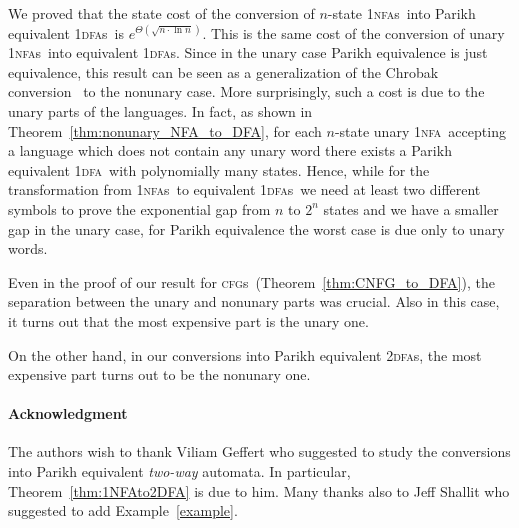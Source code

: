 \documentclass[11pt]{article}
\newcommand*{\tw}{\textsc{2}}
\newcommand*{\twdfas}{\tw\textsc{dfa}s}
\newcommand*{\ow}{\textsc{1}}
\newcommand*{\owdfa}{\ow\textsc{dfa}}
\newcommand*{\owdfas}{\ow\textsc{dfa}s}
\newcommand*{\ownfa}{\ow\textsc{nfa}}
\newcommand*{\ownfas}{\ow\textsc{nfa}s}
\newcommand*{\cfgs}{\textsc{cfg}s}
\begin{document}
We proved that the state cost of the conversion of $n$-state \ownfas\ into Parikh equivalent \owdfas\ is 
$e^{\Theta(\sqrt{n \cdot \ln n})}$. This is the same cost of the conversion of unary \ownfas\
into equivalent \owdfas.
Since in the unary case Parikh equivalence is just equivalence, this result can be seen as
a generalization of the Chrobak conversion~\cite{Chrobak1986} to the nonunary case.
More surprisingly, such a cost is due to the unary parts of the languages. In fact, as shown
in Theorem~\ref{thm:nonunary_NFA_to_DFA}, for each $n$-state unary \ownfa\ accepting a language
which does not contain any unary word there exists a Parikh equivalent \owdfa\ with polynomially many states.
Hence, while for the transformation {}from \ownfas\ to equivalent \owdfas\ we need at least two different
symbols to prove the exponential gap {}from $n$ to $2^n$ states and we have a smaller gap
in the unary case, for Parikh equivalence the worst case is due only to unary words.

Even in the proof of our result for \cfgs\ (Theorem~\ref{thm:CNFG_to_DFA}), the separation between the
unary and nonunary parts was crucial. Also in this case, it turns out that the most expensive
part is the unary one.

On the other hand, in our conversions into Parikh equivalent \twdfas, the most expensive part turns out
to be the nonunary one.

\paragraph*{Acknowledgment}
The authors wish to thank Viliam Geffert who suggested to study the conversions into
Parikh equivalent \emph{two-way} automata. In particular, Theorem~\ref{thm:1NFAto2DFA}
is due to him. Many thanks also to Jeff Shallit who suggested to add Example~\ref{example}.



\end{document}
